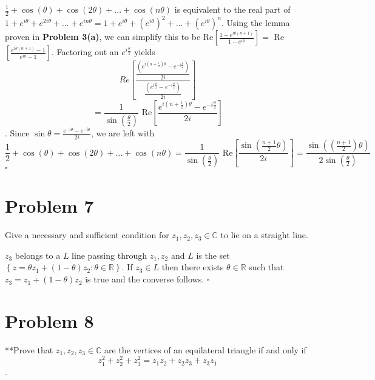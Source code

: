 \documentclass[12pt]{article}
\newcommand{\C}{\mathbb{C}}
\newcommand{\R}{\mathbb{R}}
\newcommand{\set}[1]{\left\{ #1\right\}}
\newenvironment{proof}{\noindent{\bf Proof.}}{\hfill $\square$\medskip}
\begin{document}
\begin{proof}
$\frac{1}{2}+\cos(\theta)+\cos(2\theta)+...+\cos(n\theta)$ is equivalent to the real part of $1+e^{i\theta}+e^{2i\theta}+...+e^{in\theta}=1+e^{i\theta}+(e^{i\theta})^{2}+...+(e^{i\theta})^{n}$. Using the lemma proven in \textbf{Problem 3(a)}, we can simplify this to be Re$[\frac{1-e^{i\theta(n+1)}}{1-e^{i\theta}}]=$ Re$[\frac{e^{i\theta(n+1)}-1}{e^{i\theta}-1}]$. Factoring out an $e^{i\frac{\theta}{2}}$ yields
$$Re\left[\frac{\frac{(e^{i(n+\frac{1}{2})\theta}-e^{-i\frac{\theta}{2}})}{2i}}{\frac{(e^{i\frac{\theta}{2}}-e^{-i\frac{\theta}{2}})}{2i}}\right]$$
$$=\frac{1}{\sin(\frac{\theta}{2})} \text{ Re} \left[\frac{e^{i(n+\frac{1}{2})\theta}-e^{-i\frac{\theta}{2}}}{2i}\right]$$. Since $\sin\theta=\frac{e^{-i\theta}-e^{-i\theta}}{2i}$, we are left with
$$\frac{1}{2}+\cos(\theta)+\cos(2\theta)+...+\cos(n\theta)=\frac{1}{\sin(\frac{\theta}{2})}\text{ Re}\left[\frac{\sin(\frac{n+1}{2}\theta)}{2i}\right]=\frac{\sin((\frac{n+1}{2})\theta)}{2\sin(\frac{\theta}{2})}$$
\end{proof}


\section{Problem 7}
Give a necessary and sufficient condition for $z_{1},z_{2},z_{3}\in\C$ to lie on a straight line.

\begin{proof}
$z_{3}$ belongs to a $L$ line passing through $z_{1}, z_{2}$ and $L$ is the set $\set{z=\theta z_{1}+(1-\theta)z_{2}: \theta\in\R}$. If $z_{3}\in L$ then there exists $\theta\in\R$ such that $z_{3}=z_{1}+(1-\theta)z_{2}$ is true and the converse follows.
\end{proof}


\section{Problem 8}
**Prove that $z_{1},z_{2},z_{3}\in\C$ are the vertices of an equilateral triangle if and only if
$$z_{1}^{2}+z_{2}^{2}+z_{3}^{2}=z_{1}z_{2}+z_{2}z_{3}+z_{3}z_{1}$$.
\end{document}
